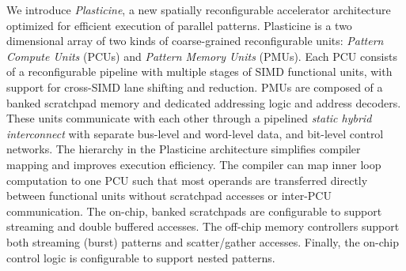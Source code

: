 We introduce {\it Plasticine}, a new spatially reconfigurable
accelerator architecture optimized for efficient execution of parallel
patterns.  Plasticine is a two dimensional array of two kinds of coarse-grained reconfigurable units:
\emph{Pattern Compute Units} (PCUs) and \emph{Pattern Memory Units} (PMUs). 
Each PCU consists of a reconfigurable pipeline with multiple stages of SIMD functional units, with support
for cross-SIMD lane shifting and reduction. 
PMUs are composed of a banked scratchpad memory and dedicated addressing logic and address decoders.
These units communicate with each other through a pipelined \emph{static hybrid interconnect} with
separate bus-level and word-level data, and bit-level control networks. The
hierarchy in the Plasticine architecture simplifies compiler mapping and improves
execution efficiency. The compiler can map inner loop computation to one PCU 
such that most operands are transferred
directly between functional units without scratchpad accesses or
inter-PCU communication. The on-chip, banked scratchpads are
configurable to support streaming and double buffered accesses.
The off-chip memory controllers
support both streaming (burst) patterns and scatter/gather
accesses. Finally, the on-chip control logic is configurable to
support nested patterns.





